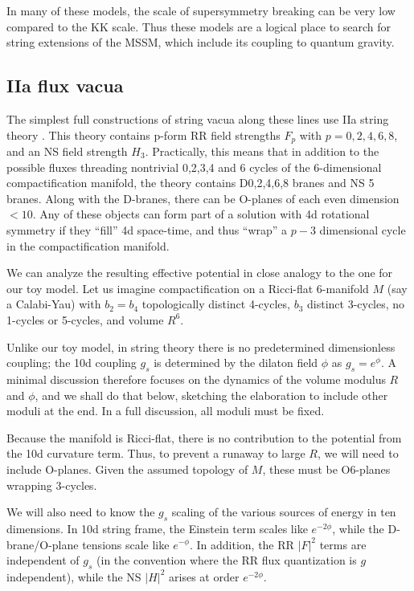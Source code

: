 \documentclass[aps,amsfonts]{ar2e}
\begin{document}
In many of these models, the scale of supersymmetry breaking can be
very low compared to the KK scale.  Thus these models are a logical
place to search for string extensions of the MSSM, which include its
coupling to quantum gravity.




\subsection{IIa flux vacua}

The simplest full constructions of string vacua along these lines
use IIa string theory
\cite{DeWolfe:2005uu,Villadoro:2005cu,Camara:2005dc}.
This theory contains p-form
RR field strengths $F_p$ with $p=0,2,4,6,8$, and
an NS field strength $H_3$.  Practically, this
means that in addition to the possible fluxes threading nontrivial
0,2,3,4 and 6 cycles of the 6-dimensional compactification manifold,
the theory contains
D0,2,4,6,8 branes and NS 5 branes.  Along with the D-branes,
there can be O-planes of each even dimension $<10$.  Any of these objects
can form part of a solution with 4d rotational
symmetry if they ``fill'' 4d space-time,
and thus ``wrap'' a $p-3$ dimensional cycle in the compactification
manifold.

We can analyze the resulting effective potential in close analogy to
the one for our toy model.  Let us imagine compactification on a
Ricci-flat 6-manifold $M$ (say a Calabi-Yau) with $b_{2}=b_{4}$
topologically distinct 4-cycles, $b_3$ distinct 3-cycles, no 1-cycles
or 5-cycles, and volume $R^6$.

Unlike our toy model, in string theory there is no predetermined
dimensionless coupling; the 10d coupling $g_s$ is determined by the
dilaton field $\phi$ as $g_s = e^{\phi}$.  A minimal discussion
therefore focuses on the dynamics of the volume modulus $R$ and
$\phi$, and we shall do that below, sketching the elaboration to
include other moduli at the end.  In a full discussion, all moduli
must be fixed.

Because the manifold is Ricci-flat, there is no contribution to the
potential from the 10d curvature term.  Thus, to prevent a runaway to
large $R$, we will need to include O-planes.  Given the assumed
topology of $M$, these must be O6-planes wrapping 3-cycles.

We will also need to know the $g_s$ scaling of the various sources of
energy in ten dimensions.  In 10d string frame, the Einstein term
scales like $e^{-2\phi}$, while the D-brane/O-plane tensions scale
like $e^{-\phi}$.  In addition, the RR $|F|^2$ terms are independent
of $g_s$ (in the convention where the RR flux quantization is $g$
independent), while the NS $|H|^2$ arises at order $e^{-2 \phi}$.
\end{document}
